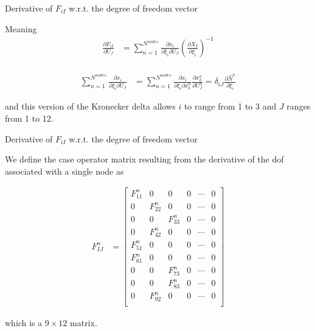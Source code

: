 \documentclass[11pt]{beamer}
\begin{document}
\begin{frame}{Derivative of $F_{iI}$ w.r.t. the degree of freedom vector}

Meaning
\begin{align*}
\frac{\partial F_{iI}}{\partial U_J} &= \sum_{n=1}^{N^{nodes}}\frac{\partial x_i}{\partial \xi_{\hat{i}} \partial U_J} \left(\frac{\partial X_I}{\partial \xi_{\hat{i}}}\right)^{-1}\\
\end{align*}

\begin{align*}
\sum_{n=1}^{N^{nodes}}\frac{\partial x_i}{\partial \xi_{\hat{i}} \partial U_J} &= \sum_{n=1}^{N^{nodes}}\frac{\partial x_i}{\partial \xi_{\hat{i}} \partial x_k^n}\frac{\partial x_k^n}{\partial U_J^n} = \delta_{iJ} \frac{\partial \hat{N}^n}{\partial \xi_{\hat{i}}}
\end{align*}

and this version of the Kronecker delta allows $i$ to range from 1 to 3 and $J$ ranges from 1 to 12.

\end{frame}

\begin{frame}{Derivative of $F_{iI}$ w.r.t. the degree of freedom vector}

We define the case operator matrix resulting from the derivative of the dof associated with a single node as

\begin{align*}
F_{IJ}^n &= \left[\begin{array}{cccccc}
F_{11}^n & 0 & 0 & 0 & \cdots & 0\\
0 & F_{22}^n & 0 & 0 & \cdots & 0\\
0 & 0 & F_{33}^n & 0 & \cdots & 0\\
0 & F_{42}^n & 0 & 0 & \cdots & 0\\
F_{51}^n & 0 & 0 & 0 & \cdots & 0\\
F_{61}^n & 0 & 0 & 0 & \cdots & 0\\
0 & 0 & F_{73}^n & 0 & \cdots & 0\\
0 & 0 & F_{83}^n & 0 & \cdots & 0\\
0 & F_{92}^n & 0 & 0 & \cdots & 0\\
\end{array}\right]
\end{align*}

which is a $9\times 12$ matrix.

\end{frame}
\end{document}

